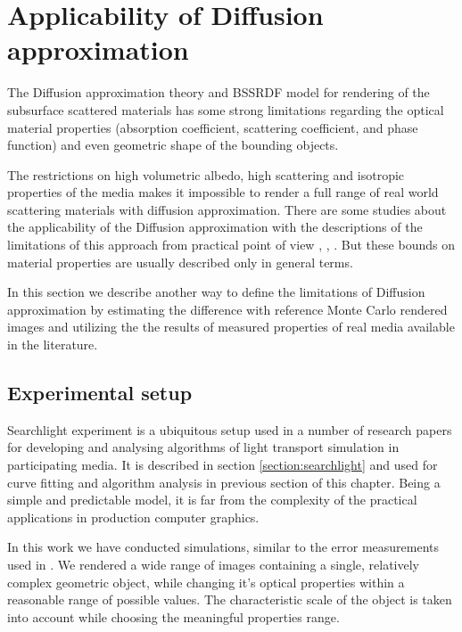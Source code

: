 \newpage
\section{Applicability of Diffusion approximation}
\label{chapter:measurements}

The Diffusion approximation theory and BSSRDF model for rendering of the subsurface scattered
materials has some strong limitations regarding the optical material properties (absorption
coefficient, scattering coefficient, and phase function) and even geometric shape of the bounding
objects.

The restrictions on high volumetric albedo, high scattering and isotropic properties of the media
makes it impossible to render a full range of real world scattering materials with diffusion
approximation.
There are some studies about the applicability of the Diffusion approximation with the descriptions
of the limitations of this approach from practical point of view \cite{Donner:2009:EBM},
\cite{Gkioulekas:2013:URP:2516971.2516972}, \cite{Zhao:2014:HSR:2601097.2601104}. But these bounds
on material properties are usually described only in general terms.

In this section we describe another way to define the limitations of Diffusion approximation  by
estimating the difference with reference Monte Carlo rendered images and utilizing the the results
of measured properties of real media available in the literature.

\subsection{Experimental setup}
Searchlight experiment is a ubiquitous setup used in a number of research papers for developing
and analysing algorithms of light transport simulation in participating media. It is described in
section \ref{section:searchlight} and used for curve fitting and algorithm analysis in previous
section of this chapter. Being a simple and predictable model, it is far from the complexity of the 
practical applications in production computer graphics.

In this work we have conducted simulations, similar to the error measurements used in
\cite{Zhao:2014:HSR:2601097.2601104}. We rendered a wide range of images containing a single,
relatively complex geometric object, while changing it's optical properties within a reasonable
range of possible values. The characteristic scale of the object is taken into account while
choosing the meaningful properties range.

